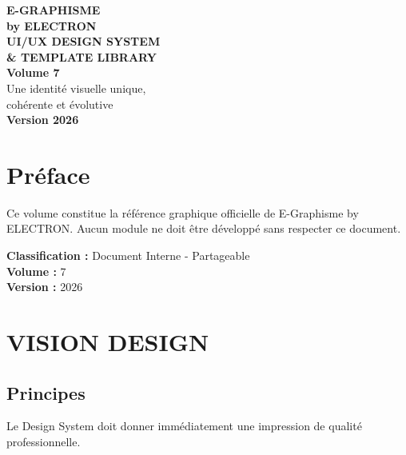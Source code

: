 \documentclass[12pt,a4paper,oneside]{book}
\begin{document}
\begin{titlepage}
\thispagestyle{empty}
\begin{center}
\vspace*{2cm}
{\Huge\bfseries\color{bleuIA}E-GRAPHISME}\\[0.3cm]
{\LARGE\bfseries\color{violet}by ELECTRON}\\[2cm]
\vspace{2cm}
{\huge\bfseries\color{noir}UI/UX DESIGN SYSTEM}\\[0.3cm]
{\huge\bfseries\color{noir}\& TEMPLATE LIBRARY}\\[1cm]
{\Large\bfseries\color{cyan}Volume 7}\\[3cm]
\vspace{2cm}
{\Large\color{gris}Une identité visuelle unique,}\\[0.3cm]
{\Large\color{gris}cohérente et évolutive}\\[3cm]
{\Large\bfseries\color{or}Version 2026}\\[2cm]
\vfill
\end{center}
\end{titlepage}

\frontmatter

\chapter*{Préface}
Ce volume constitue la référence graphique officielle de E-Graphisme by ELECTRON. Aucun module ne doit être développé sans respecter ce document.

\bigskip
\textbf{Classification :} Document Interne - Partageable\\
\textbf{Volume :} 7\\
\textbf{Version :} 2026

\tableofcontents

\mainmatter

\chapter{VISION DESIGN}

\section{Principes}
Le Design System doit donner immédiatement une impression de qualité professionnelle.
\end{document}
